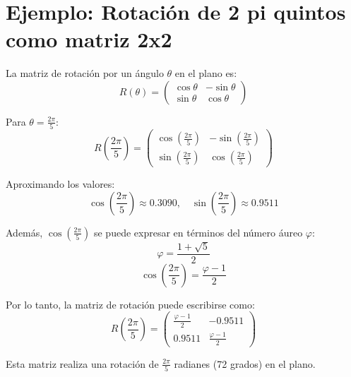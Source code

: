 \section{Ejemplo: Rotación de 2 pi quintos como matriz 2x2}\label{sec:ejemplo}
La matriz de rotación por un ángulo $\theta$ en el plano es:
\begin{equation*}
R(\theta) = \begin{pmatrix}
\cos \theta & -\sin \theta \\
\sin \theta & \cos \theta
\end{pmatrix}
\end{equation*}

Para $\theta = \frac{2\pi}{5}$:
\begin{equation*}
R\left(\frac{2\pi}{5}\right) = \begin{pmatrix}
\cos\left(\frac{2\pi}{5}\right) & -\sin\left(\frac{2\pi}{5}\right) \\
\sin\left(\frac{2\pi}{5}\right) & \cos\left(\frac{2\pi}{5}\right)
\end{pmatrix}
\end{equation*}

Aproximando los valores:
\begin{equation*}
\cos\left(\frac{2\pi}{5}\right) \approx 0.3090, \quad \sin\left(\frac{2\pi}{5}\right) \approx 0.9511
\end{equation*}

Además, $\cos\left(\frac{2\pi}{5}\right)$ se puede expresar en términos del número áureo $\varphi$:
\begin{equation*}
\varphi = \frac{1 + \sqrt{5}}{2}
\end{equation*}
\begin{equation*}
\cos\left(\frac{2\pi}{5}\right) = \frac{\varphi - 1}{2}
\end{equation*}

Por lo tanto, la matriz de rotación puede escribirse como:
\begin{equation*}
R\left(\frac{2\pi}{5}\right) = \begin{pmatrix}
\frac{\varphi - 1}{2} & -0.9511 \\
0.9511 & \frac{\varphi - 1}{2}
\end{pmatrix}
\end{equation*}

Esta matriz realiza una rotación de $\frac{2\pi}{5}$ radianes (72 grados) en el plano.
